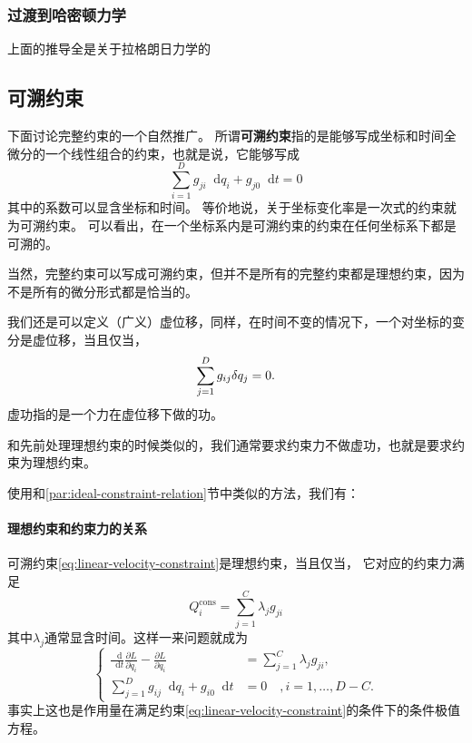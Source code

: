 \documentclass[UTF8, a4paper]{ctexart}
\newcommand*{\diff}{\mathop{}\!\mathrm{d}}
\begin{document}
\subsubsection{过渡到哈密顿力学}

上面的推导全是关于拉格朗日力学的

\subsection{可溯约束}

下面讨论完整约束的一个自然推广。
所谓\textbf{可溯约束}指的是能够写成坐标和时间全微分的一个线性组合的约束，也就是说，它能够写成
\begin{equation}
    \sum_{i=1}^D g_{ji} \diff q_i + g_{j0} \diff t = 0
    \label{eq:linear-velocity-constraint}
\end{equation}
其中的系数可以显含坐标和时间。
等价地说，关于坐标变化率是一次式的约束就为可溯约束。
可以看出，在一个坐标系内是可溯约束的约束在任何坐标系下都是可溯的。

当然，完整约束可以写成可溯约束，但并不是所有的完整约束都是理想约束，因为不是所有的微分形式都是恰当的。

我们还是可以定义（广义）虚位移，同样，在时间不变的情况下，一个对坐标的变分是虚位移，当且仅当，
\begin{equation}
    \sum_{j=1}^D g_{ij} \var q_j = 0.
\end{equation}
虚功指的是一个力在虚位移下做的功。

和先前处理理想约束的时候类似的，我们通常要求约束力不做虚功，也就是要求约束为理想约束。

使用和\ref{par:ideal-constraint-relation}节中类似的方法，我们有：
\paragraph{理想约束和约束力的关系} 可溯约束\eqref{eq:linear-velocity-constraint}是理想约束，当且仅当，
它对应的约束力满足
\begin{equation}
    Q^{\text{cons}}_i = \sum_{j=1}^C \lambda_j g_{ji}
\end{equation}
其中$\lambda_j$通常显含时间。这样一来问题就成为
\begin{equation}
    \left\{
        \begin{aligned}
            \frac{\diff}{\diff t} \frac{\partial L}{\partial \dot{q}_i} - \frac{\partial L}{\partial q_i} &= \sum_{j=1}^C \lambda_j g_{ji}, \\
            \sum_{j=1}^D g_{ij} \diff q_i + g_{i0} \diff t &= 0 \quad, i = 1, \ldots, D-C.
        \end{aligned}
    \right.
    \label{eq:traceable-constraint-motion}
\end{equation}
事实上这也是作用量在满足约束\eqref{eq:linear-velocity-constraint}的条件下的条件极值方程。
\end{document}
